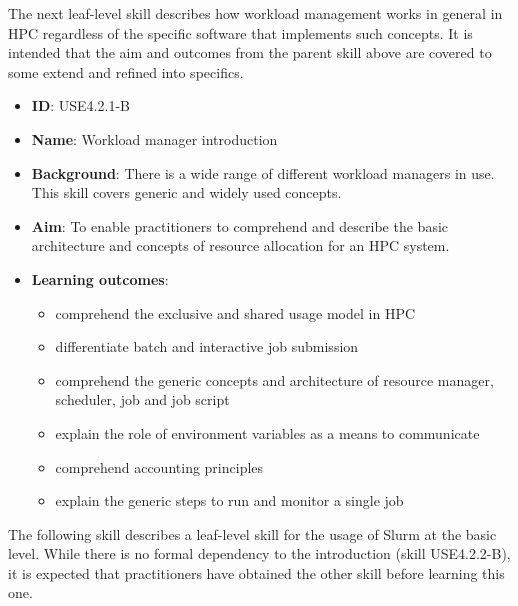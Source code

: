 \documentclass[jocse]{jocseart}
\begin{document}
The next leaf-level skill describes how workload management works in general in HPC regardless of the specific software that implements such concepts.
It is intended that the aim and outcomes from the parent skill above are covered to some extend and refined into specifics.


\begin{itemize}
  \item \textbf{ID}: USE4.2.1-B
  \item \textbf{Name}: Workload manager introduction
  \item \textbf{Background}: There is a wide range of different workload managers in use. This skill covers generic and widely used concepts.
  \item \textbf{Aim}: To enable practitioners to comprehend and describe the basic architecture and concepts of resource allocation for an HPC system.
  \item \textbf{Learning outcomes}:

  \begin{itemize}
  \item comprehend the exclusive and shared usage model in HPC
  \item differentiate batch and interactive job submission
  \item comprehend the generic concepts and architecture of resource manager, scheduler, job and job script
  \item explain the role of environment variables as a means to communicate
  \item comprehend accounting principles
  \item explain the generic steps to run and monitor a single job
  \end{itemize}
\end{itemize}


The following skill describes a leaf-level skill for the usage of Slurm at the basic level.
While there is no formal dependency to the introduction (skill USE4.2.2-B), it is expected that practitioners have obtained the other skill before learning this one.
\end{document}
